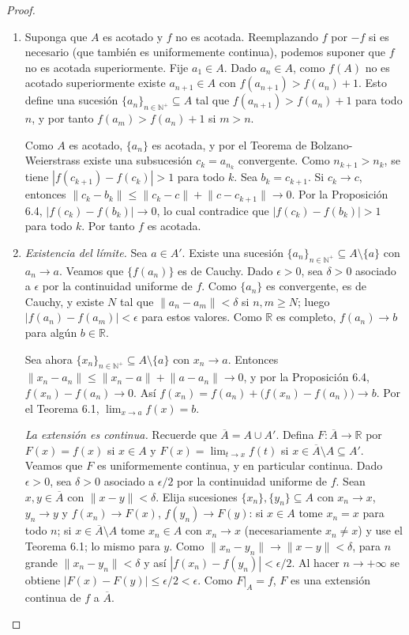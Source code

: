 \documentclass[11pt]{article}
\newcommand{\R}{\mathbb{R}}
\newcommand{\N}{\mathbb{N}}
\newcommand{\norm}[1]{\lVert #1\rVert}
\begin{document}
  \begin{proof}
  \begin{enumerate}
  \item Suponga que $A$ es acotado y $f$ no es acotada. Reemplazando $f$ por $-f$ si es necesario (que también es uniformemente continua), podemos suponer que $f$ no es acotada superiormente. Fije $a_1\in A$. Dado $a_n\in A$, como $f(A)$ no es acotado superiormente existe $a_{n+1}\in A$ con $f(a_{n+1})>f(a_n)+1$. Esto define una sucesión $\{a_n\}_{n\in\N^+}\subseteq A$ tal que $f(a_{n+1})>f(a_n)+1$ para todo $n$, y por tanto $f(a_m)>f(a_n)+1$ si $m>n$.

  Como $A$ es acotado, $\{a_n\}$ es acotada, y por el Teorema de Bolzano-Weierstrass existe una subsucesión $c_k=a_{n_k}$ convergente. Como $n_{k+1}>n_k$, se tiene $|f(c_{k+1})-f(c_k)|>1$ para todo $k$. Sea $b_k=c_{k+1}$. Si $c_k\to c$, entonces $\norm{c_k-b_k}\le\norm{c_k-c}+\norm{c-c_{k+1}}\to 0$. Por la Proposición 6.4, $|f(c_k)-f(b_k)|\to 0$, lo cual contradice que $|f(c_k)-f(b_k)|>1$ para todo $k$. Por tanto $f$ es acotada.

  \item \emph{Existencia del límite.} Sea $a\in A'$. Existe una sucesión $\{a_n\}_{n\in\N^+}\subseteq A\setminus\{a\}$ con $a_n\to a$. Veamos que $\{f(a_n)\}$ es de Cauchy. Dado $\epsilon>0$, sea $\delta>0$ asociado a $\epsilon$ por la continuidad uniforme de $f$. Como $\{a_n\}$ es convergente, es de Cauchy, y existe $N$ tal que $\norm{a_n-a_m}<\delta$ si $n,m\ge N$; luego $|f(a_n)-f(a_m)|<\epsilon$ para estos valores. Como $\R$ es completo, $f(a_n)\to b$ para algún $b\in\R$.

  Sea ahora $\{x_n\}_{n\in\N^+}\subseteq A\setminus\{a\}$ con $x_n\to a$. Entonces $\norm{x_n-a_n}\le\norm{x_n-a}+\norm{a-a_n}\to 0$, y por la Proposición 6.4, $f(x_n)-f(a_n)\to 0$. Así $f(x_n)=f(a_n)+\big(f(x_n)-f(a_n)\big)\to b$. Por el Teorema 6.1, $\lim_{x\to a}f(x)=b$.

  \emph{La extensión es continua.} Recuerde que $\overline{A}=A\cup A'$. Defina $F:\overline{A}\to\R$ por $F(x)=f(x)$ si $x\in A$ y $F(x)=\lim_{t\to x}f(t)$ si $x\in\overline{A}\setminus A\subseteq A'$. Veamos que $F$ es uniformemente continua, y en particular continua. Dado $\epsilon>0$, sea $\delta>0$ asociado a $\epsilon/2$ por la continuidad uniforme de $f$. Sean $x,y\in\overline{A}$ con $\norm{x-y}<\delta$. Elija sucesiones $\{x_n\},\{y_n\}\subseteq A$ con $x_n\to x$, $y_n\to y$ y $f(x_n)\to F(x)$, $f(y_n)\to F(y)$: si $x\in A$ tome $x_n=x$ para todo $n$; si $x\in\overline{A}\setminus A$ tome $x_n\in A$ con $x_n\to x$ (necesariamente $x_n\neq x$) y use el Teorema 6.1; lo mismo para $y$. Como $\norm{x_n-y_n}\to\norm{x-y}<\delta$, para $n$ grande $\norm{x_n-y_n}<\delta$ y así $|f(x_n)-f(y_n)|<\epsilon/2$. Al hacer $n\to+\infty$ se obtiene $|F(x)-F(y)|\le\epsilon/2<\epsilon$. Como $F|_A=f$, $F$ es una extensión continua de $f$ a $\overline{A}$.
  \end{enumerate}


\end{proof}
\end{document}
